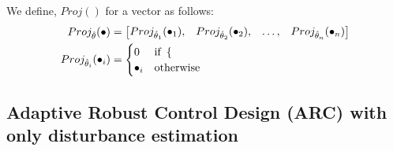 We define,  $Proj()$ for a vector as follows:
\begin{align*}
    Proj_{\hat \theta} (\bullet) &= \begin{bmatrix} Proj_{\hat \theta_1}(\bullet_1), &
                                        Proj_{\hat \theta_2}(\bullet_2), &
                                        \hdots, &
                                        Proj_{\hat \theta_n}(\bullet_n) \end{bmatrix}\\
    Proj_{\hat \theta_i}(\bullet_i) &= \begin{cases}
        0 & \text{if } \begin{cases}
                       \end{cases}\\
        \bullet_i & \text{otherwise}
    \end{cases}
\end{align*}

\subsection{Adaptive Robust Control Design (ARC) with only disturbance estimation}

